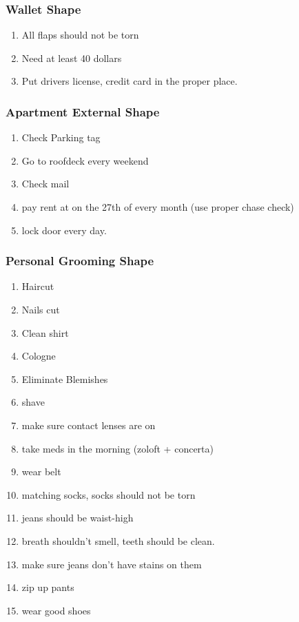 \begin{frame} 
\frametitle{Wallet Shape} 
\begin{enumerate}
\item \small All flaps should not be torn
\item \small Need at least 40 dollars
\item \small Put drivers license, credit card in the proper place.
\end{enumerate}
\end{frame} 

\begin{frame} 
\frametitle{Apartment External Shape} 
\begin{enumerate}
\item \small Check Parking tag 
\item \small Go to roofdeck every weekend
\item \small Check mail 
\item \small pay rent at on the 27th of every month (use proper chase check)
\item \small lock door every day. 
\end{enumerate}
\end{frame} 

\begin{frame} 
\frametitle{Personal Grooming Shape} 
\begin{enumerate}
\item \small Haircut
\item \small Nails cut
\item \small Clean shirt
\item \small Cologne 
\item \small Eliminate Blemishes
\item \small shave
\item \small make sure contact lenses are on
\item \small take meds in the morning (zoloft + concerta)
\item \small wear belt
\item \small matching socks, socks should not be torn
\item \small jeans should be waist-high
\item \small breath shouldn't smell, teeth should be clean. 
\item \small make sure jeans don't have stains on them
\item \small zip up pants
\item \small wear good shoes 
\end{enumerate}
\end{frame}

